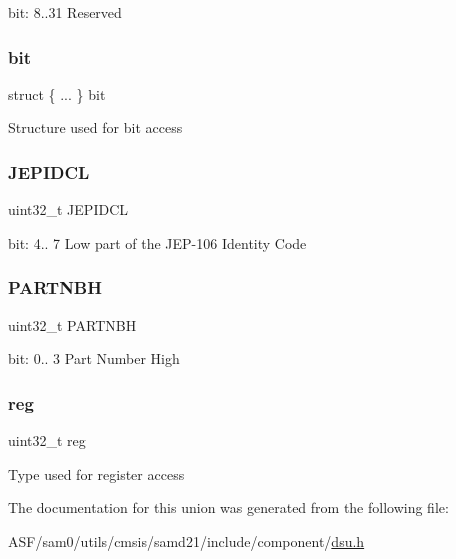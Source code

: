 bit\+: 8..31 Reserved \mbox{\label{union_d_s_u___p_i_d1___type_a50dd8eedbda7ba9ff27c0badd5f45ad8}} 
\subsubsection{\texorpdfstring{bit}{bit}}
{\footnotesize\ttfamily struct \{ ... \}   bit}

Structure used for bit access \mbox{\label{union_d_s_u___p_i_d1___type_a0f4893153b1ef366310a83de468f0a08}} 
\subsubsection{\texorpdfstring{JEPIDCL}{JEPIDCL}}
{\footnotesize\ttfamily uint32\+\_\+t J\+E\+P\+I\+D\+CL}

bit\+: 4.. 7 Low part of the J\+E\+P-\/106 Identity Code \mbox{\label{union_d_s_u___p_i_d1___type_a2c986ac59c285a22c13815824d169842}} 
\subsubsection{\texorpdfstring{PARTNBH}{PARTNBH}}
{\footnotesize\ttfamily uint32\+\_\+t P\+A\+R\+T\+N\+BH}

bit\+: 0.. 3 Part Number High \mbox{\label{union_d_s_u___p_i_d1___type_a6b91636401516a477989a336376d7b40}} 
\subsubsection{\texorpdfstring{reg}{reg}}
{\footnotesize\ttfamily uint32\+\_\+t reg}

Type used for register access 

The documentation for this union was generated from the following file\+:\begin{DoxyCompactItemize}
\item 
A\+S\+F/sam0/utils/cmsis/samd21/include/component/\mbox{\hyperlink{component_2dsu_8h}{dsu.\+h}}\end{DoxyCompactItemize}
